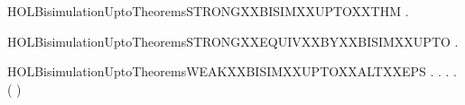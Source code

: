 \newcommand{\HOLBisimulationUptoTheoremsSTRONGXXBISIMXXUPTOXXLEMMA}{\UseVerbatim{HOLBisimulationUptoTheoremsSTRONGXXBISIMXXUPTOXXLEMMA}}
\begin{SaveVerbatim}{HOLBisimulationUptoTheoremsSTRONGXXBISIMXXUPTOXXTHM}
\HOLTokenTurnstile{} \HOLSymConst{\HOLTokenForall{}}.   \HOLSymConst{\HOLTokenImp{}}   
\end{SaveVerbatim}
\newcommand{\HOLBisimulationUptoTheoremsSTRONGXXBISIMXXUPTOXXTHM}{\UseVerbatim{HOLBisimulationUptoTheoremsSTRONGXXBISIMXXUPTOXXTHM}}
\begin{SaveVerbatim}{HOLBisimulationUptoTheoremsSTRONGXXEQUIVXXBYXXBISIMXXUPTO}
\HOLTokenTurnstile{} \HOLSymConst{\HOLTokenForall{}}  .   \HOLSymConst{\HOLTokenConj{}}    \HOLSymConst{\HOLTokenImp{}}   
\end{SaveVerbatim}
\newcommand{\HOLBisimulationUptoTheoremsSTRONGXXEQUIVXXBYXXBISIMXXUPTO}{\UseVerbatim{HOLBisimulationUptoTheoremsSTRONGXXEQUIVXXBYXXBISIMXXUPTO}}
\begin{SaveVerbatim}{HOLBisimulationUptoTheoremsWEAKXXBISIMXXUPTOXXALTXXEPS}
\HOLTokenTurnstile{} \HOLSymConst{\HOLTokenForall{}}.
         \HOLSymConst{\HOLTokenImp{}}
       \HOLSymConst{\HOLTokenForall{}} .
              \HOLSymConst{\HOLTokenImp{}}
           \HOLSymConst{\HOLTokenForall{}}.
                  \HOLSymConst{\HOLTokenImp{}}
               \HOLSymConst{\HOLTokenExists{}}.
                      \HOLSymConst{\HOLTokenConj{}}
                   (    )  
\end{SaveVerbatim}
\newcommand{\HOLBisimulationUptoTheoremsWEAKXXBISIMXXUPTOXXALTXXEPS}{\UseVerbatim{HOLBisimulationUptoTheoremsWEAKXXBISIMXXUPTOXXALTXXEPS}}
